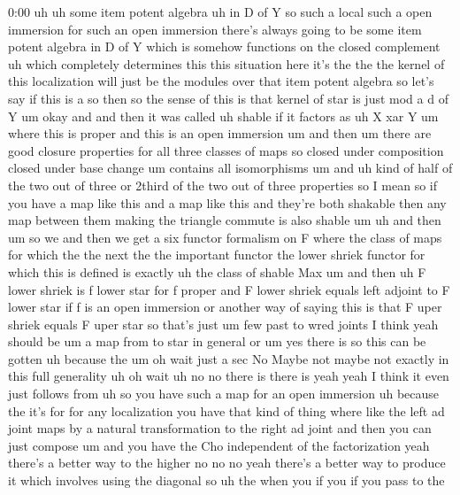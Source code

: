 \begin{unfinished}{0:00}
uh  uh  some  item  potent
algebra  uh  in  D  of
Y  so  such  a  local  such  a  open  immersion
for  such  an  open  immersion  there's
always  going  to  be  some  item  potent
algebra  in  D  of  Y  which  is  somehow
functions  on  the  closed  complement  uh
which  completely  determines  this  this
situation  here  it's  the  the  the  kernel
of  this  localization  will  just  be  the
modules  over  that  item  potent  algebra  so
let's  say  if  this  is  a  so  then  so  the
sense  of  this  is  that  kernel  of  star  is
just  mod
a  d  of
Y
um  okay  and  and  then  it  was
called  uh
shable  if  it
factors  as  uh  X  xar  Y  um  where  this  is
proper  and  this  is  an  open
immersion
um  and  then  um  there  are  good  closure
properties  for  all  three
classes  of
maps  so  closed  under  composition  closed
under  base  change  um  contains  all
isomorphisms  um  and  uh  kind  of  half  of
the  two  out  of  three  or  2third  of  the
two  out  of  three  properties  so  I  mean  so
if  you  have  a  map  like  this  and  a  map
like  this  and  they're  both  shakable  then
any  map  between  them  making  the  triangle
commute  is  also
shable
um
uh  and  then
um  so  we  and  then  we  get  a  six  functor
formalism  on
F  where  the  class  of
maps  for
which  the  the  next  the  the  important
functor  the  lower  shriek
functor  for  which  this  is
defined  is
exactly  uh  the  class  of  shable
Max
um  and
then  uh  F  lower  shriek  is  f  lower  star
for  f
proper  and  F  lower  shriek  equals  left
adjoint  to  F  lower  star  if  f  is  an  open
immersion  or  another  way  of  saying  this
is  that  F  uper  shriek  equals  F  uper  star
so  that's  just  um  few  past  to  wred
joints  I  think  yeah  should
be  um  a  map  from  to  star  in  general  or
um  yes  there  is  so
this  can  be  gotten  uh  because
the
um
oh  wait  just  a  sec  No  Maybe  not  maybe
not  exactly  in  this  full
generality  uh  oh  wait
uh  no  no  there  is  there  is  yeah  yeah  I
think  it  even  just  follows
from  uh  so  you  have  such  a  map  for  an
open
immersion  uh  because  the  it's  for  for
any  localization  you  have  that  kind  of
thing  where  like  the  left  ad  joint  maps
by  a  natural  transformation  to  the  right
ad  joint  and  then  you  can  just
compose  um  and  you  have  the  Cho
independent  of  the  factorization  yeah
there's  a  better  way  to  the  higher  no  no
no  yeah  there's  a  better  way  to  produce
it  which  involves  using  the  diagonal  so
uh
the  when  you  if  you  if  you  pass  to  the

\end{unfinished}
